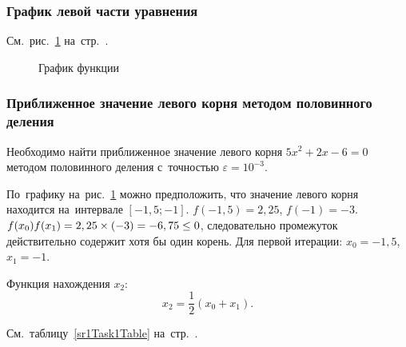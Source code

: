 \documentclass[10pt, a4paper, titlepage]{article}
\newcommand*\hm[1]{#1\nobreak\discretionary{}{\hbox{$\mathsurround=0pt #1$}}{}} %
\begin{document}
\subsubsection*{График левой части уравнения}

См.~рис.~\ref{sr1Task1Function} на~стр.~\pageref{sr1Task1Function}.

\begin{figure}[htb]
    \centering
    \caption{График функции}
    \label{sr1Task1Function}
\end{figure}

\subsubsection*{Приближенное значение левого корня методом половинного деления}

Необходимо найти приближенное значение левого корня $5x^2+2x-6=0$ методом половинного деления с~точностью $\varepsilon=10^{-3}$.

По~графику на~рис.~\ref{sr1Task1Function} можно предположить, что значение левого корня находится на~интервале $[-1,5;-1]$. $f(-1,5)=2,25$, $f(-1)=-3$. $f(x_0)f(x_1) \hm =2,25\times(-3)=-6,75\leq0$, следовательно промежуток действительно содержит хотя бы один корень. Для первой итерации: $x_0=-1,5$, $x_1=-1$.

Функция нахождения $x_2$:
$$x_2=\frac{1}{2}(x_0+x_1).$$

См.~таблицу~\ref{sr1Task1Table} на~стр.~\pageref{sr1Task1Table}.
\end{document}
